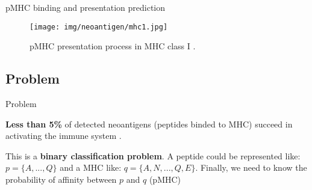 \documentclass[10pt]{beamer}
\newcommand{\1}{
	\setbeamertemplate{background}{
		\texttt{[image: img/1]}
		\tikz[overlay] \fill[fill opacity=0.75,fill=white] (0,0) rectangle (-\paperwidth,\paperheight);
	}
}
\begin{document}
\begin{frame}{pMHC binding and presentation prediction}{}		
	\begin{figure}[H]
		\centering
		\texttt{[image: img/neoantigen/mhc1.jpg]}
		\caption{pMHC presentation process in MHC class I \cite{zhang2019application}.}
		\label{fig:mhc1}
	\end{figure}	
\end{frame}

\subsection{Problem}

\begin{frame}{Problem}{}
	
	\begin{block}{}
		\textbf{Less than 5\%} of detected neoantigens (peptides binded to MHC) succeed in activating the immune system \cite{de2020neoantigen}.
	\end{block}
			
			
	\begin{block}{}
		This is a \textbf{binary classification problem}. A peptide could be represented like: $p = \{ A, ... , Q \}$ and a MHC like: $q = \{ A, N, ... ,Q, E \}$. Finally, we need to know the probability of affinity between $p$ and $q$ (pMHC)
	\end{block}
	
	
\end{frame}
\end{document}
